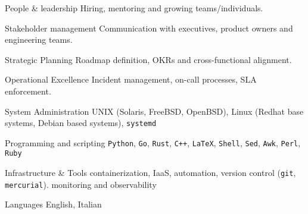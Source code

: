 \begin{cvskills}

  \cvskill
  {People \& leadership} %
  {Hiring, mentoring and growing teams/individuals.}

  \cvskill
  {Stakeholder management} %
  {Communication with executives, product owners and engineering teams.}

  \cvskill
  {Strategic Planning} %
  {Roadmap definition, OKRs and cross-functional alignment.}

  \cvskill
  {Operational Excellence} %
  {Incident management, on-call processes, SLA enforcement.}

  \cvskill
  {System Administration} %
  {UNIX (Solaris, FreeBSD, OpenBSD), Linux (Redhat base systems, Debian based systems), \texttt{systemd}}

  \cvskill
  {Programming and scripting} %
  {\texttt{Python}, \texttt{Go}, \texttt{Rust}, \texttt{C++}, \texttt{LaTeX}, \texttt{Shell}, \texttt{Sed}, \texttt{Awk}, \texttt{Perl}, \texttt{Ruby}} %

  \cvskill
  {Infrastructure \& Tools} %
  {containerization, IaaS, automation, version control (\texttt{git}, \texttt{mercurial}). monitoring and observability}

  \cvskill
  {Languages} %
  {English, Italian} %

\end{cvskills}


